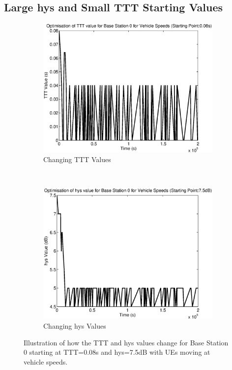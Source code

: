 \subsection{Large hys and Small TTT Starting Values}\label{ap:veh_highhys}
\begin{figure}[H]
        \centering
        \begin{subfigure}[b]{0.49\textwidth}
                \includegraphics[width=\textwidth]{figures/graphs/vehhighhys/TTT0.eps}
                \caption{Changing TTT Values}
        \end{subfigure}%
        ~ %
        \begin{subfigure}[b]{0.49\textwidth}
                \includegraphics[width=\textwidth]{figures/graphs/vehhighhys/hys0.eps}
                \caption{Changing hys Values}
        \end{subfigure}
        \caption{Illustration of how the TTT and hys values change for Base Station 0 starting at TTT=0.08s and hys=7.5dB with UEs moving at vehicle speeds.}
\end{figure}
